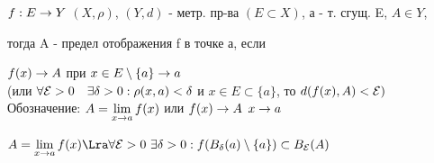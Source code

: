 \documentclass[main]{subfiles}
\begin{document}
    \begin{definition}
        $f:E \rightarrow Y$ $(X, \rho)$, $(Y,d)$ - метр. пр-ва $(E \subset X)$, а - т. сгущ. E, $A \in Y$,

        тогда A - предел отображения f в точке а, если

        $f(x) \rightarrow A$ при $x \in E \setminus \{a\}\rightarrow a$\\
        (или $\forall \mathcal{E}>0 \quad \exists \delta>0: \rho(x,a)<\delta$ и $x \in E \subset \{a\}$, то $d(f(x),A) < \mathcal{E})$\\
        Обозначение: $A=\lim\limits_{x \rightarrow a} f(x)$ или $f(x) \rightarrow A$ $x \rightarrow a$
    \end{definition}

    \begin{remark}
        $A=\lim\limits_{x \ra a} f(x) \Lra \forall \E > 0 \ \e \delta>0: f(B_\delta(a) \setminus \{a\}) \subset B_\E (A)$
    \end{remark}
\end{document}
